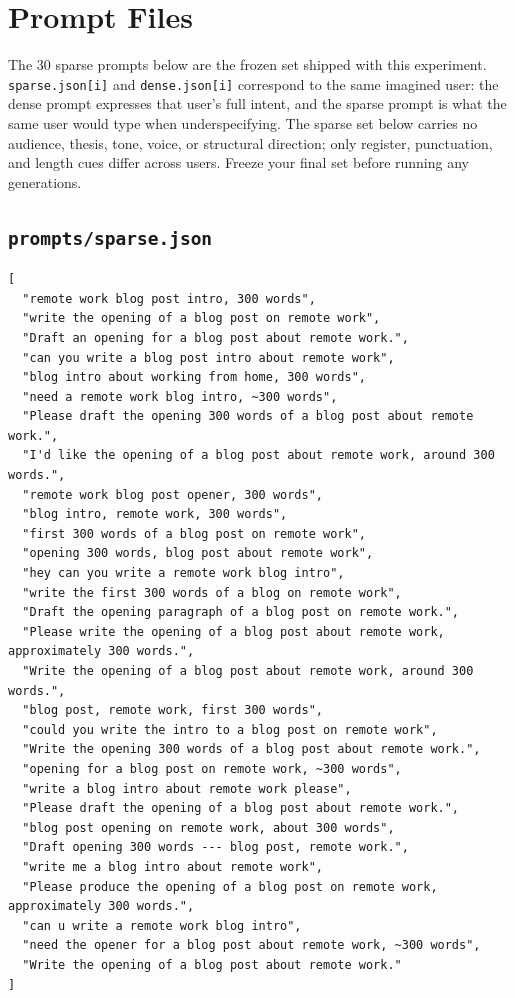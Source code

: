 \documentclass[11pt]{article}
\begin{document}
\section{Prompt Files}

The 30 sparse prompts below are the frozen set shipped with this experiment. \texttt{sparse.json[i]} and \texttt{dense.json[i]} correspond to the same imagined user: the dense prompt expresses that user's full intent, and the sparse prompt is what the same user would type when underspecifying. The sparse set below carries no audience, thesis, tone, voice, or structural direction; only register, punctuation, and length cues differ across users. Freeze your final set before running any generations.

\subsection{\texttt{prompts/sparse.json}}

\begin{lstlisting}[style=jsonstyle,language={}]
[
  "remote work blog post intro, 300 words",
  "write the opening of a blog post on remote work",
  "Draft an opening for a blog post about remote work.",
  "can you write a blog post intro about remote work",
  "blog intro about working from home, 300 words",
  "need a remote work blog intro, ~300 words",
  "Please draft the opening 300 words of a blog post about remote work.",
  "I'd like the opening of a blog post about remote work, around 300 words.",
  "remote work blog post opener, 300 words",
  "blog intro, remote work, 300 words",
  "first 300 words of a blog post on remote work",
  "opening 300 words, blog post about remote work",
  "hey can you write a remote work blog intro",
  "write the first 300 words of a blog on remote work",
  "Draft the opening paragraph of a blog post on remote work.",
  "Please write the opening of a blog post about remote work, approximately 300 words.",
  "Write the opening of a blog post about remote work, around 300 words.",
  "blog post, remote work, first 300 words",
  "could you write the intro to a blog post on remote work",
  "Write the opening 300 words of a blog post about remote work.",
  "opening for a blog post on remote work, ~300 words",
  "write a blog intro about remote work please",
  "Please draft the opening of a blog post about remote work.",
  "blog post opening on remote work, about 300 words",
  "Draft opening 300 words --- blog post, remote work.",
  "write me a blog intro about remote work",
  "Please produce the opening of a blog post on remote work, approximately 300 words.",
  "can u write a remote work blog intro",
  "need the opener for a blog post about remote work, ~300 words",
  "Write the opening of a blog post about remote work."
]
\end{lstlisting}
\end{document}
